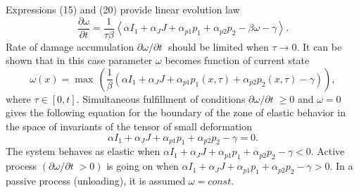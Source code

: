\documentclass[article,authoryear,jpm]{beg_39}             %
\begin{document}
Expressions (15) and (20) provide linear evolution law
\begin{equation}
\frac{\partial \omega }{\partial t}=\frac{1}{\tau \beta }\left\langle \alpha {{I}_{1}}+{{\alpha }_{J}}J+{{\alpha }_{p1}}{{p}_{1}}+{{\alpha }_{p2}}{{p}_{2}}-\beta \omega -\gamma \right\rangle.
\end{equation}
Rate of damage accumulation ${\partial \omega }/{\partial t}\;$ should be limited when $\tau \to 0$. It can be shown that in this case parameter $\omega$ becomes function of current state
\begin{equation}
\omega(x) ={\mathop{\max}}\,\left( \frac{1}{\beta }\left( \alpha {{I}_{1}}+{{\alpha }_{J}}J+{{\alpha}_{p1}}{{p}_{1}(x,\tau)}+{{\alpha}_{p2}}{{p}_{2}(x,\tau)}-\gamma  \right) \right),
\end{equation}
where $\tau \in [0,t]$.
Simultaneous fulfillment of conditions ${\partial \omega }/{\partial t}\;\ge 0$ and $\omega =0$ gives the following equation for the boundary of the zone of elastic behavior in the space of invariants of the tensor of small deformation
\begin{equation}
\alpha {{I}_{1}}+{{\alpha }_{J}}J+{{\alpha }_{p1}}{{p}_{1}}+{{\alpha }_{p2}}{{p}_{2}}-\gamma =0.
\end{equation}
The system behaves as elastic when $\alpha {{I}_{1}}+{{\alpha }_{J}}J+{{\alpha }_{p1}}{{p}_{1}}+{{\alpha }_{p2}}{{p}_{2}}-\gamma <0$. Active process $({\partial \omega }/{\partial t}\;>0)$ is going on when $\alpha {{I}_{1}}+{{\alpha }_{J}}J+{{\alpha }_{p1}}{{p}_{1}}+{{\alpha }_{p2}}{{p}_{2}}-\gamma >0$. In a passive process (unloading), it is assumed $\omega =const$.
\end{document}

